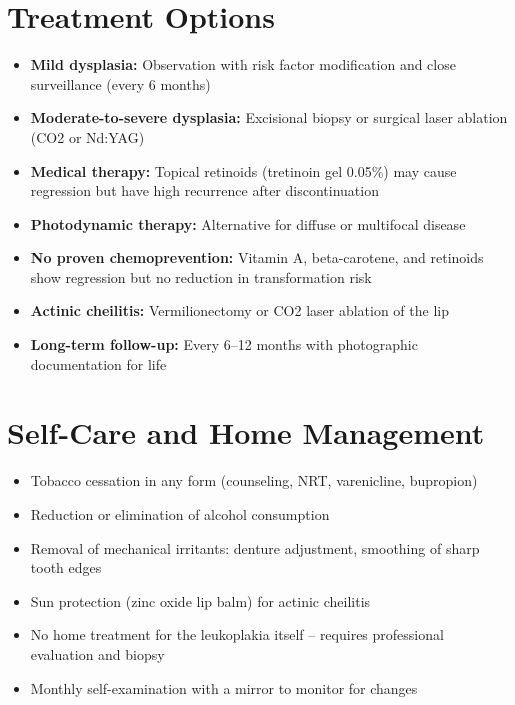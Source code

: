 \section*{Treatment Options}
\begin{itemize}
  \item \textbf{Mild dysplasia:} Observation with risk factor modification and close surveillance (every 6 months)
  \item \textbf{Moderate-to-severe dysplasia:} Excisional biopsy or surgical laser ablation (CO2 or Nd:YAG)
  \item \textbf{Medical therapy:} Topical retinoids (tretinoin gel 0.05\%) may cause regression but have high recurrence after discontinuation
  \item \textbf{Photodynamic therapy:} Alternative for diffuse or multifocal disease
  \item \textbf{No proven chemoprevention:} Vitamin A, beta-carotene, and retinoids show regression but no reduction in transformation risk
  \item \textbf{Actinic cheilitis:} Vermilionectomy or CO2 laser ablation of the lip
  \item \textbf{Long-term follow-up:} Every 6--12 months with photographic documentation for life
\end{itemize}

\section*{Self-Care and Home Management}
\begin{itemize}
  \item Tobacco cessation in any form (counseling, NRT, varenicline, bupropion)
  \item Reduction or elimination of alcohol consumption
  \item Removal of mechanical irritants: denture adjustment, smoothing of sharp tooth edges
  \item Sun protection (zinc oxide lip balm) for actinic cheilitis
  \item No home treatment for the leukoplakia itself -- requires professional evaluation and biopsy
  \item Monthly self-examination with a mirror to monitor for changes
\end{itemize}

